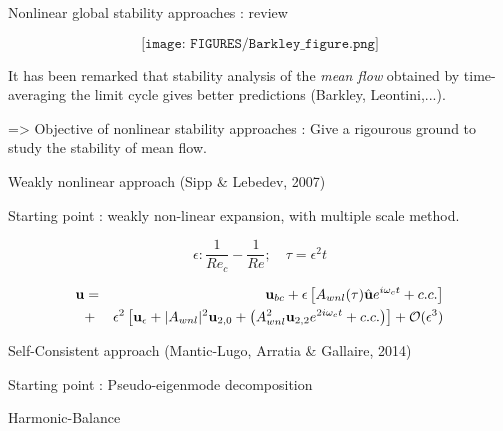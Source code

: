 \documentclass{beamer}
\newcommand{\ssp}{\vspace{.2cm} }
\begin{document}
\begin{frame}{Nonlinear global stability approaches : review}


 
$$
\texttt{[image: FIGURES/Barkley\_figure.png]}
$$

 
 
 \ssp It has been remarked that stability analysis of the {\em mean flow} obtained by time-averaging the limit cycle gives better predictions (Barkley, Leontini,...).
  
  
\ssp 
  
  => Objective of nonlinear stability approaches : Give a rigourous ground to study the stability of mean flow.
  
  

\end{frame}

\begin{frame}{Weakly nonlinear approach {\small (Sipp \& Lebedev, 2007)}}

Starting point : weakly non-linear expansion, with multiple scale method.

$$
\epsilon : \frac{1}{Re_c} - \frac{1}{Re} ; \quad \tau = \epsilon^2 t
$$

\begin{eqnarray}
{\bf u} &=& {\bf u}_{bc} + \epsilon \left[ A_{wnl} (\tau) \hat{\bf u} e^{i \omega_c t} + c.c. \right] \label{WNL1}\\
&+& \epsilon^2 \left[ {\bf u}_\epsilon + |A_{wnl}|^2  {\bf u}_{2,0} + \left(  A_{wnl}^2 {\bf u}_{2,2} e^{2 i \omega_c t} + c.c. \right) \right] + {\cal O}( \epsilon ^3)
\nonumber
\end{eqnarray}


\end{frame}



\begin{frame}{Self-Consistent approach {\small (Mantic-Lugo, Arratia \& Gallaire, 2014)}}

Starting point : Pseudo-eigenmode decomposition



\end{frame}


\begin{frame}{Harmonic-Balance}

\end{frame}
\end{document}
